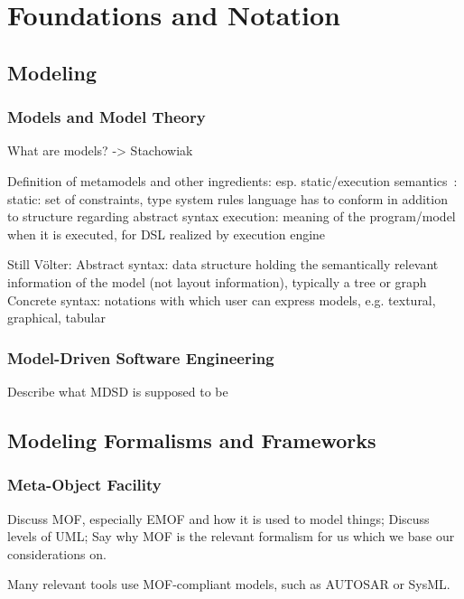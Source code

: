 \chapter{Foundations and Notation
}
\label{chap:foundations}

\section{Modeling}

\subsection{Models and Model Theory}
\label{chap:foundations:modeling:models}
What are models? -> Stachowiak

Definition of metamodels and other ingredients:
esp. static/execution semantics~\cite[p. 26]{voelter2013DslEngineering}:
static: set of constraints, type system rules language has to conform in addition to structure regarding abstract syntax
execution: meaning of the program/model when it is executed, for DSL realized by execution engine

Still Völter:
Abstract syntax: data structure holding the semantically relevant information of the model (not layout information), typically a tree or graph
Concrete syntax: notations with which user can express models, e.g. textural, graphical, tabular


\subsection{Model-Driven Software Engineering}
Describe what MDSD is supposed to be


\section{Modeling Formalisms and Frameworks}
\label{chap:foundations:formalisms}

\subsection{Meta-Object Facility}
\label{chap:foundations:formalisms:mof}
Discuss \gls{MOF}, especially \gls{EMOF} and how it is used to model things;
Discuss levels of UML;
Say why MOF is the relevant formalism for us which we base our considerations on.

Many relevant tools use MOF-compliant models, such as AUTOSAR or SysML.

